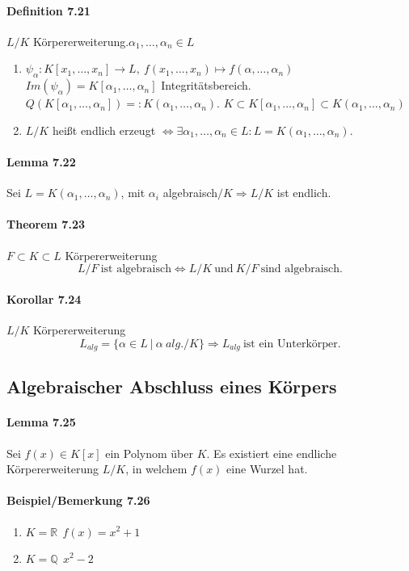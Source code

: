 \documentclass{scrartcl}
\newcommand{\Q}{\mathbb{Q}}
\newcommand{\R}{\mathbb{R}}
\begin{document}
\paragraph{Definition 7.21}
$L/K$ Körpererweiterung.$\alpha_1,\dots,\alpha_n\in L$
\begin{enumerate}{}

\item $\psi_\alpha: K[x_1,\dots,x_n]\to L,~f(x_1,\dots,x_n)\mapsto f(\alpha,\dots,\alpha_n)$~~
  $Im(\psi_\alpha)=K[\alpha_1,\dots,\alpha_n]$ Integritätsbereich.
  $Q(K[\alpha_1,\dots,\alpha_n])=:K(\alpha_1,\dots,\alpha_n)$. $K\subset
  K[\alpha_1,\dots,\alpha_n]\subset K(\alpha_1,\dots,\alpha_n)$
\item $L/K$ heißt endlich erzeugt $\Leftrightarrow \exists
  \alpha_1,\dots,\alpha_n\in L: L=K(\alpha_1,\dots,\alpha_n)$.
\end{enumerate}

\paragraph{Lemma 7.22}
Sei $L=K(\alpha_1,\dots,\alpha_n)$, mit $\alpha_i$ algebraisch$/K \Rightarrow
L/K$ ist endlich.

\paragraph{Theorem 7.23}
$F\subset K\subset L$ Körpererweiterung
\[
  L/F ~\text{ist algebraisch} \Leftrightarrow L/K~\text{und}~ K/F~\text{sind algebraisch.}
\]

\paragraph{Korollar 7.24}
$L/K$ Körpererweiterung
\[
  L_{alg}=\{\alpha\in L ~|~ \alpha~alg./K\} \Rightarrow L_{alg}~\text{ist ein Unterkörper.}
\]

\subsection{Algebraischer Abschluss eines Körpers}

\paragraph{Lemma 7.25}
Sei $f(x)\in K[x]$ ein Polynom über $K$. Es existiert eine endliche
Körpererweiterung $L/K$, in welchem $f(x)$ eine Wurzel hat.

\paragraph{Beispiel/Bemerkung 7.26}
\begin{enumerate}{}
\item $K=\R~~f(x)=x^2+1$
\item $K=\Q~~x^2-2$
\end{enumerate}
\end{document}
